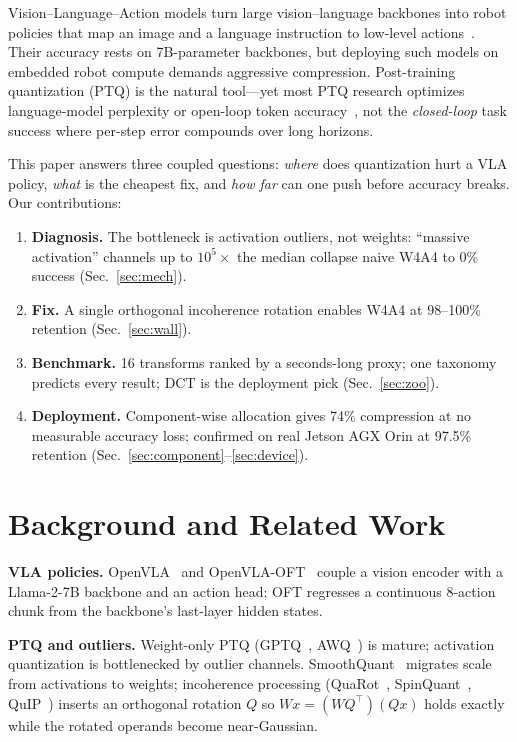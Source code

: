 \documentclass[conference]{IEEEtran}
\begin{document}
Vision--Language--Action models turn large vision--language backbones into robot policies that map
an image and a language instruction to low-level actions~\cite{openvla,openvlaoft}. Their accuracy
rests on 7B-parameter backbones, but deploying such models on embedded robot compute demands
aggressive compression. Post-training quantization (PTQ) is the natural tool---yet most PTQ
research optimizes language-model perplexity or open-loop token accuracy~\cite{gptq,awq,smoothquant,quarot,spinquant},
not the \emph{closed-loop} task success where per-step error compounds over long horizons.

This paper answers three coupled questions: \emph{where} does quantization hurt a VLA policy,
\emph{what} is the cheapest fix, and \emph{how far} can one push before accuracy breaks. Our
contributions:
\begin{enumerate}
  \item \textbf{Diagnosis.} The bottleneck is activation outliers, not weights: ``massive
        activation'' channels up to $10^5\times$ the median collapse naive W4A4 to 0\% success
        (Sec.~\ref{sec:mech}).
  \item \textbf{Fix.} A single orthogonal incoherence rotation enables W4A4 at 98--100\%
        retention (Sec.~\ref{sec:wall}).
  \item \textbf{Benchmark.} 16 transforms ranked by a seconds-long proxy; one taxonomy predicts
        every result; DCT is the deployment pick (Sec.~\ref{sec:zoo}).
  \item \textbf{Deployment.} Component-wise allocation gives 74\% compression at no measurable
        accuracy loss; confirmed on real Jetson AGX Orin at 97.5\% retention
        (Sec.~\ref{sec:component}--\ref{sec:device}).
\end{enumerate}

\section{Background and Related Work}

\textbf{VLA policies.}
OpenVLA~\cite{openvla} and OpenVLA-OFT~\cite{openvlaoft} couple a vision encoder with a
Llama-2-7B backbone and an action head; OFT regresses a continuous 8-action chunk from the
backbone's last-layer hidden states.

\textbf{PTQ and outliers.}
Weight-only PTQ (GPTQ~\cite{gptq}, AWQ~\cite{awq}) is mature; activation quantization is
bottlenecked by outlier channels. SmoothQuant~\cite{smoothquant} migrates scale from activations
to weights; incoherence processing (QuaRot~\cite{quarot}, SpinQuant~\cite{spinquant},
QuIP~\cite{quip}) inserts an orthogonal rotation $Q$ so $Wx = (WQ^\top)(Qx)$ holds exactly while
the rotated operands become near-Gaussian.
\end{document}
